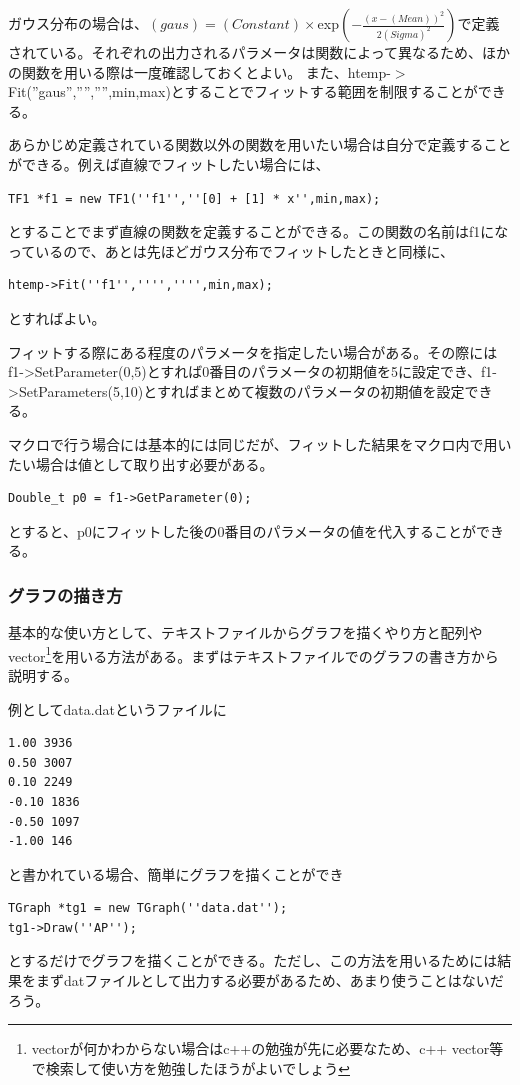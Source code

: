 \documentclass[uplatex,10pt,a4j]{jsarticle}
\begin{document}
ガウス分布の場合は、$(gaus)=(Constant)\times$exp$(-\frac{(x-(Mean))^2}{2(Sigma)^2})$で定義されている。それぞれの出力されるパラメータは関数によって異なるため、ほかの関数を用いる際は一度確認しておくとよい。
また、htemp-$>$Fit(''gaus'','''','''',min,max)とすることでフィットする範囲を制限することができる。

あらかじめ定義されている関数以外の関数を用いたい場合は自分で定義することができる。例えば直線でフィットしたい場合には、
\begin{lstlisting}
TF1 *f1 = new TF1(''f1'',''[0] + [1] * x'',min,max);
 \end{lstlisting}
とすることでまず直線の関数を定義することができる。この関数の名前はf1になっているので、あとは先ほどガウス分布でフィットしたときと同様に、
\begin{lstlisting}
htemp->Fit(''f1'','''','''',min,max);
 \end{lstlisting}
とすればよい。

フィットする際にある程度のパラメータを指定したい場合がある。その際にはf1->SetParameter(0,5)とすれば0番目のパラメータの初期値を5に設定でき、f1->SetParameters(5,10)とすればまとめて複数のパラメータの初期値を設定できる。

マクロで行う場合には基本的には同じだが、フィットした結果をマクロ内で用いたい場合は値として取り出す必要がある。
\begin{lstlisting}
Double_t p0 = f1->GetParameter(0);
 \end{lstlisting}
とすると、p0にフィットした後の0番目のパラメータの値を代入することができる。

\subsubsection{グラフの描き方}
基本的な使い方として、テキストファイルからグラフを描くやり方と配列やvector\footnote{vectorが何かわからない場合はc++の勉強が先に必要なため、c++ vector等で検索して使い方を勉強したほうがよいでしょう}を用いる方法がある。まずはテキストファイルでのグラフの書き方から説明する。

例としてdata.datというファイルに
\begin{lstlisting}
1.00 3936
0.50 3007
0.10 2249
-0.10 1836
-0.50 1097
-1.00 146
 \end{lstlisting}
と書かれている場合、簡単にグラフを描くことができ
\begin{lstlisting}
TGraph *tg1 = new TGraph(''data.dat'');
tg1->Draw(''AP'');
 \end{lstlisting}
とするだけでグラフを描くことができる。ただし、この方法を用いるためには結果をまずdatファイルとして出力する必要があるため、あまり使うことはないだろう。
\end{document}
